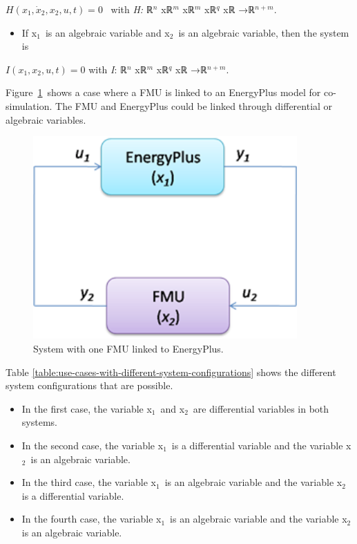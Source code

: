 \(H\left(x_1,\dot x_2,x_2,u,t\right) = 0\) ~with \emph{H:} ℝ\(^{n}\) xℝ\(^{m}\) xℝ\(^{m}\) xℝ\(^{q}\) xℝ →ℝ\(^{n+m}\).

\begin{itemize}
\tightlist
\item
  If x\(_{1}\)~is an algebraic variable and x\(_{2}\)~is an algebraic variable, then the system is
\end{itemize}

\(I\left(x_1,x_2,u,t\right) = 0\) with \emph{I}: ℝ\(^{n}\) xℝ\(^{m}\) xℝ\(^{q}\) xℝ →ℝ\(^{n+m}\).

Figure~\ref{fig:system-with-one-fmu-linked-to-energyplus.}~shows a case where a FMU is linked to an EnergyPlus model for co-simulation. The FMU and EnergyPlus could be linked through differential or algebraic variables.

\begin{figure}[hbtp] %
\centering
\includegraphics[width=0.9\textwidth, height=0.9\textheight, keepaspectratio=true]{media/image016.png}
\caption{System with one FMU linked to EnergyPlus. \protect \label{fig:system-with-one-fmu-linked-to-energyplus.}}
\end{figure}

Table \ref{table:use-cases-with-different-system-configurations} shows the different system configurations that are possible. 

\begin{itemize}
\item
  In the first case, the variable x\(_{1}\)~and x\(_{2}\)~are differential variables in both systems.
\item
  In the second case, the variable x\(_{1}\)~is a differential variable and the variable x\(_{2}\)~is an algebraic variable.
\item
  In the third case, the variable x\(_{1}\)~is an algebraic variable and the variable x\(_{2}\) is a differential variable.
\item
  In the fourth case, the variable x\(_{1}\)~is an algebraic variable and the variable x\(_{2}\) is an algebraic variable.
\end{itemize}

